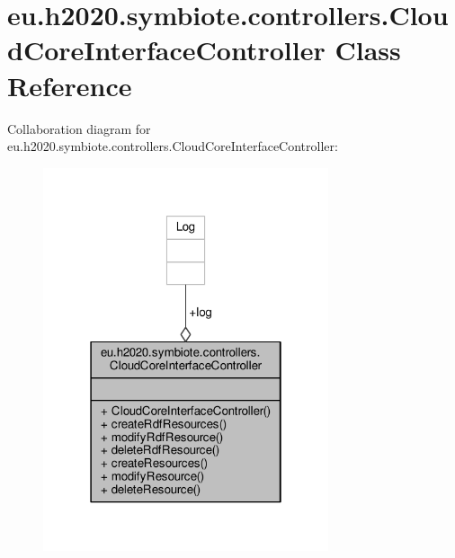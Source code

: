 \hypertarget{classeu_1_1h2020_1_1symbiote_1_1controllers_1_1CloudCoreInterfaceController}{}\section{eu.\+h2020.\+symbiote.\+controllers.\+Cloud\+Core\+Interface\+Controller Class Reference}
\label{classeu_1_1h2020_1_1symbiote_1_1controllers_1_1CloudCoreInterfaceController}


Collaboration diagram for eu.\+h2020.\+symbiote.\+controllers.\+Cloud\+Core\+Interface\+Controller\+:
\nopagebreak
\begin{figure}[H]
\begin{center}
\leavevmode
\includegraphics[width=238pt]{classeu_1_1h2020_1_1symbiote_1_1controllers_1_1CloudCoreInterfaceController__coll__graph}
\end{center}
\end{figure}
